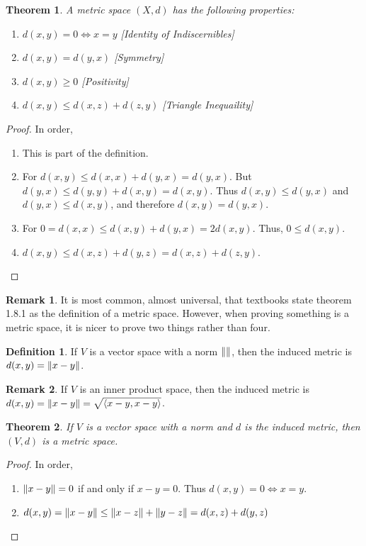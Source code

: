 \documentclass[oneside]{book}
\newtheorem{theorem}{Theorem}[section]
\theoremstyle{definition}
\newtheorem{definition}{Definition}[section]
\newtheorem{remark}{Remark}[section]
\begin{document}
\begin{theorem}
A metric space $(X,d)$ has the following properties:
\begin{enumerate}
\item $d(x,y) = 0 \Leftrightarrow x=y$ \hfill [Identity of Indiscernibles]
\item $d(x,y) = d(y,x)$ \hfill [Symmetry]
\item $d(x,y) \geq 0$ \hfill [Positivity]
\item $d(x,y) \leq d(x,z)+d(z,y)$ \hfill [Triangle Inequaility]
\end{enumerate}
\end{theorem}
\begin{proof}
In order,
\begin{enumerate}
\item This is part of the definition.
\item For $d(x,y) \leq d(x,x)+d(y,x) = d(y,x)$. But $d(y,x) \leq d(y,y)+d(x,y) = d(x,y)$. Thus $d(x,y)\leq d(y,x)$ and $d(y,x) \leq d(x,y)$, and therefore $d(x,y) = d(y,x)$.
\item For $0=d(x,x) \leq d(x,y)+d(y,x) = 2d(x,y)$. Thus, $0\leq d(x,y)$.
\item $d(x,y)\leq d(x,z)+d(y,z) = d(x,z)+d(z,y)$.
\end{enumerate}
\end{proof}

\begin{remark}
It is most common, almost universal, that textbooks state theorem 1.8.1 as the definition of a metric space. However, when proving something is a metric space, it is nicer to prove two things rather than four.
\end{remark}

\begin{definition}
If $V$ is a vector space with a norm $\norm{}$, then the induced metric is $d(x,y) = \norm{x-y}$.
\end{definition}

\begin{remark}
If $V$ is an inner product space, then the induced metric is $d(x,y) = \norm{x-y} = \sqrt{\langle x-y,x-y\rangle }$.
\end{remark}

\begin{theorem}
If $V$ is a vector space with a norm and $d$ is the induced metric, then $(V,d)$ is a metric space.
\end{theorem}
\begin{proof}
In order,
\begin{enumerate}
\item $\norm{x-y} = 0$ if and only if $x-y = 0$. Thus $d(x,y) = 0 \Leftrightarrow x=y$.
\item $d(x,y) = \norm{x-y}\leq \norm{x-z}+\norm{y-z} = d(x,z)+d(y,z)$
\end{enumerate}
\end{proof}
\end{document}
